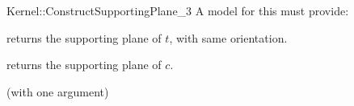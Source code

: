 \begin{ccRefFunctionObjectConcept}{Kernel::ConstructSupportingPlane_3}
A model for this must provide:


       {returns the supporting plane of $t$, with same orientation.}

       {returns the supporting plane of $c$.}

\ccRefines
{} (with one argument)

\ccSeeAlso
{} \\
 \\

\end{ccRefFunctionObjectConcept}

